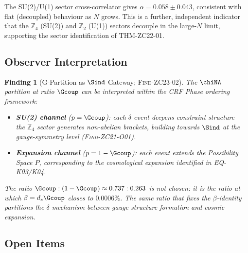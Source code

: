 \documentclass[12pt, a4paper]{article}
\newtheorem{finding}{Finding}[section]
\begin{document}
The SU(2)/U(1) sector cross-correlator gives $\alpha = 0.058\pm0.043$,
consistent with flat (decoupled) behaviour as $N$ grows.
This is a further, independent indicator that the $\mathbb{Z}_4$
(SU(2)) and $\mathbb{Z}_2$ (U(1)) sectors decouple in the large-$N$ limit,
supporting the sector identification of THM-ZC22-01.

\subsection{Observer Interpretation}
\label{zc23:sec:observer}

\begin{finding}[G-Partition as $\Sind$ Gateway; \textsc{Find-ZC23-02}]
\label{zc23:find:observer}
The $\chiNA$ partition at ratio $\Gcoup$ can be interpreted within the
CRF Phase ordering framework:
\begin{itemize}[leftmargin=*, noitemsep]
  \item \textbf{SU(2) channel} ($p=\Gcoup$):
    each $\delta$-event \emph{deepens} constraint structure —
    the $\mathbb{Z}_4$ sector generates non-abelian brackets,
    building towards $\Sind$ at the gauge-symmetry level
    (\textsc{Find-ZC21-O01}).
  \item \textbf{Expansion channel} ($p=1-\Gcoup$):
    each event extends the Possibility Space $P$,
    corresponding to the cosmological expansion identified in EQ-K03/K04.
\end{itemize}
The ratio $\Gcoup : (1-\Gcoup) \approx 0.737 : 0.263$ is not chosen:
it is the ratio at which $\beta = d_s\Gcoup$ closes to $0.0006\%$.
The same ratio that fixes the $\beta$-identity partitions the
$\delta$-mechanism between gauge-structure formation and cosmic expansion.
\end{finding}

\subsection{Open Items}
\label{zc23:sec:open}
\end{document}

